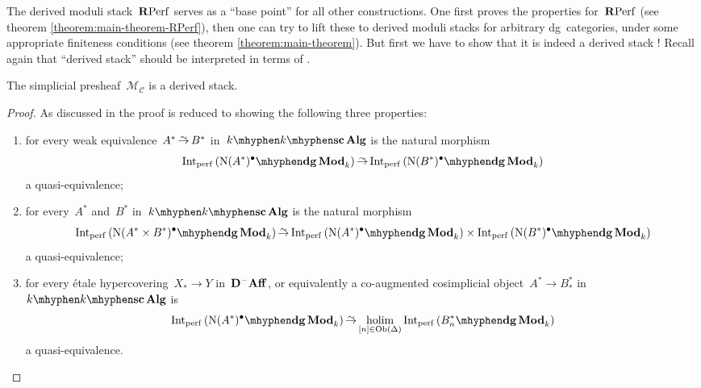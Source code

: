 \begin{refsection}
The derived moduli stack~$\mathbf{R}\mathrm{Perf}$ serves as a ``base point'' for all other constructions. One first proves the properties for~$\mathbf{R}\mathrm{Perf}$ (see theorem \ref{theorem:main-theorem-RPerf}), then one can try to lift these to derived moduli stacks for arbitrary dg~categories, under some appropriate finiteness conditions (see theorem \ref{theorem:main-theorem}). But first we have to show that it is indeed a derived stack \cite[lemma 3.1]{toen-vaquie}! Recall again that ``derived stack'' should be interpreted in terms of \cite[definition 1.3.2.1]{hagII}.

\begin{theorem}
  \label{theorem:derived-moduli-stack-is-stack}
  The simplicial presheaf~$\mathcal{M}_{\mathcal{C}}$ is a derived stack.

  \begin{proof}[Proof]
    As discussed in \cite[corollary 1.3.2.4]{hagII} the proof is reduced to showing the following three properties:
    \begin{enumerate}
      \item for every weak equivalence~$A^*\weq B^*$ in~$k\mhyphen\scAlg$ is the natural morphism
        \begin{equation}
          \label{equation:condition-1}
          \Int_\perf\left( {\nerve(A^*)^\bullet}\mhyphen\dgMod_k \right)\weq\Int_\perf\left( {\nerve(B^*)^\bullet}\mhyphen\dgMod_k \right)
        \end{equation}
        a quasi-equivalence;
      \item for every~$A^*$ and~$B^*$ in~$k\mhyphen\scAlg$ is the natural morphism
        \begin{equation}
          \Int_\perf\left( {\nerve(A^*\times B^*)^\bullet}\mhyphen\dgMod_k \right)\weq\Int_\perf\left( {\nerve(A^*)^\bullet}\mhyphen\dgMod_k \right)\times\Int_\perf\left( {\nerve(B^*)^\bullet}\mhyphen\dgMod_k \right)
        \end{equation}
        a quasi-equivalence;
      \item for every \'etale hypercovering~$X_*\to Y$ in~$\mathbf{D}^-\mathbf{Aff}$, or equivalently a co-augmented cosimplicial object~$A^*\to B_*^*$ in~$k\mhyphen\scAlg$ is
        \begin{equation}
          \label{equation:condition-3}
          \Int_\perf\left( {\nerve(A^*)^\bullet}\mhyphen\dgMod_k \right)\weq\holim_{[n]\in\Ob(\Delta)}\Int_\perf\left( {B_n^*}\mhyphen\dgMod_k \right)
        \end{equation}
        a quasi-equivalence.
    \end{enumerate}


\end{proof}
\end{theorem}
\end{refsection}
